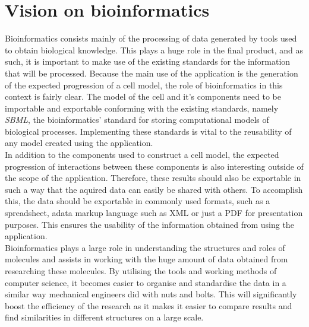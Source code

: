 \documentclass[10pt,a4paper]{report}
\begin{document}
	\section{Vision on bioinformatics}
		Bioinformatics consists mainly of the processing of data generated by tools used to obtain biological knowledge. This plays a huge role in the final product, and as such, it is important to make use of the existing standards for the information that will be processed. Because the main use of the application is the generation of the expected progression of a cell model, the role of bioinformatics in this context is fairly clear. The model of the cell and it's components need to be importable and exportable conforming with the existing standards, namely \emph{SBML}, the bioinformatics' standard for storing computational models of biological processes. Implementing these standards is vital to the reusability of any model created using the application. \\
		In addition to the components used to construct a cell model, the expected progression of interactions between these components is also interesting outside of the scope of the application. Therefore, these results should also be exportable in such a way that the aquired data can easily be shared with others. To accomplish this, the data should be exportable in commonly used formats, such as a spreadsheet, adata markup language such as XML or just a PDF for presentation purposes. This ensures the usability of the information obtained from using the application.\\
		Bioinformatics plays a large role in understanding the structures and roles of molecules and assists in working with the huge amount of data obtained from researching these molecules. By utilising the tools and working methods of computer science, it becomes easier to organise and standardise the data in a similar way mechanical engineers did with nuts and bolts. This will significantly boost the efficiency of the research as it makes it easier to compare results and find similarities in different structures on a large scale.
	
\end{document}
